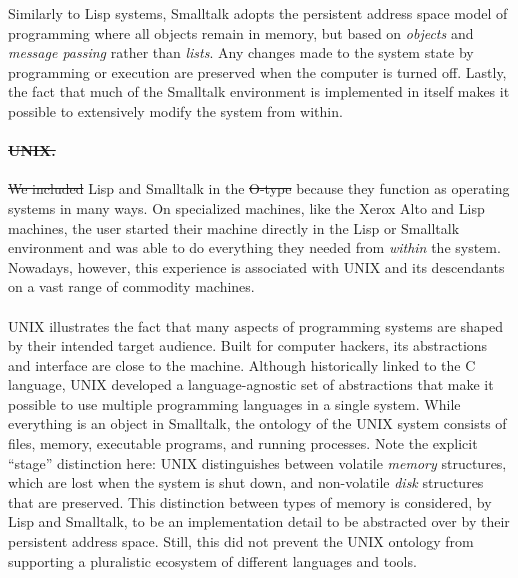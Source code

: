 \documentclass[english,submission]{programming}
\providecommand{\DIFadd}[1]{{\protect\color{blue}\uwave{#1}}} %
\providecommand{\DIFdel}[1]{{\protect\color{red}\sout{#1}}}                      %
\providecommand{\DIFaddbegin}{} %
\providecommand{\DIFaddend}{} %
\providecommand{\DIFdelbegin}{} %
\providecommand{\DIFdelend}{} %
\begin{document}
Similarly to Lisp systems, Smalltalk adopts the persistent address space
model of programming where all objects remain in memory, but based on
\emph{objects} and \emph{message passing} rather than \emph{lists}. Any
changes made to the system state by programming or execution are
preserved when the computer is turned off. Lastly, the fact that much of
the Smalltalk environment is implemented in itself makes it possible to
extensively modify the system from within.

\DIFdelbegin \paragraph{\DIFdel{UNIX.}}
\addtocounter{paragraph}{-1}%

\DIFdel{We included }\DIFdelend \DIFaddbegin \DIFadd{We include }\DIFaddend Lisp and Smalltalk in the \DIFdelbegin \DIFdel{O-type }\DIFdelend \DIFaddbegin \DIFadd{OS-likes }\DIFaddend because they function as
operating systems in many ways. On specialized machines, like the Xerox
Alto and Lisp machines, the user started their machine directly in the
Lisp or Smalltalk environment and was able to do everything they needed
from \emph{within} the system. Nowadays, however, this experience is
associated with UNIX and its descendants on a vast range of commodity
machines.

\DIFaddbegin \paragraph{\DIFadd{UNIX.}}

\DIFaddend UNIX illustrates the fact that many aspects of programming systems are
shaped by their intended target audience. Built for computer
hackers\DIFaddbegin \DIFadd{~\mbox{%
\cite{Hackers}}\hspace{0pt}%
}\DIFaddend , its abstractions and interface are close to the
machine. Although historically linked to the C language, UNIX developed
a language-agnostic set of abstractions that make it possible to use
multiple programming languages in a single system. While everything is
an object in Smalltalk, the ontology of the UNIX system consists of
files, memory, executable programs, and running processes. Note the
explicit ``stage'' distinction here: UNIX distinguishes between volatile
\emph{memory} structures, which are lost when the system is shut down,
and non-volatile \emph{disk} structures that are preserved. This
distinction between types of memory is considered, by Lisp and
Smalltalk, to be an implementation detail to be abstracted over by their
persistent address space. Still, this did not prevent the UNIX ontology
from supporting a pluralistic ecosystem of different languages and
tools.
\end{document}
